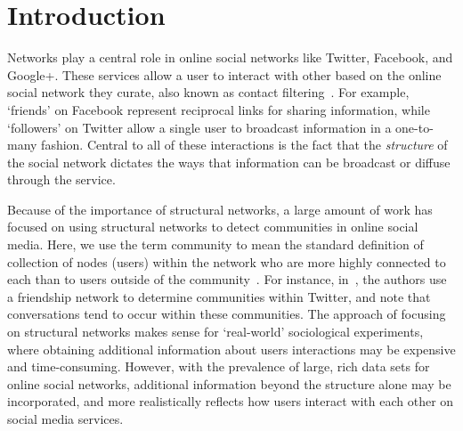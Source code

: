 \documentclass[letterpaper]{article}
\begin{document}
\section{Introduction}

Networks play a central role in online social networks like Twitter, Facebook, and Google+. These services allow a user to interact with other based on the online social network they curate, also known as contact filtering~\cite{cazabet2012automated}. For example, `friends' on Facebook represent reciprocal links for sharing information, while `followers' on Twitter allow a single user to broadcast information in a one-to-many fashion. Central to all of these interactions is the fact that the \emph{structure} of the social network dictates the ways that information can be broadcast or diffuse through the service.

Because of the importance of structural networks, a large amount of work has focused on using structural networks to detect communities in online social media. Here, we use the term community to mean the standard definition of collection of nodes (users) within the network who are more highly connected to each than to users outside of the community~\cite{newman2004finding}. For instance, in~\cite{java2009we}, the authors use a friendship network to determine communities within Twitter, and note that conversations tend to occur within these communities. The approach of focusing on structural networks makes sense for `real-world' sociological experiments, where obtaining additional information about users interactions may be expensive and time-consuming. However, with the prevalence of large, rich data sets for online social networks, additional information beyond the structure alone may be incorporated, and more realistically reflects how users interact with each other on social media services.




\end{document}
